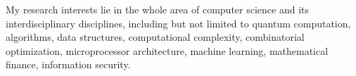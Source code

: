 
My research interests lie in the whole area of computer science
and its interdisciplinary disciplines,
including but not limited to
quantum computation,
algorithms, data structures,
computational complexity, combinatorial optimization,
microprocessor architecture,
machine learning,
mathematical finance,
information security.

\endinput
